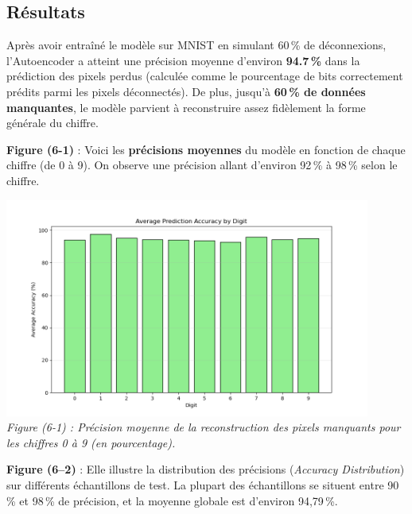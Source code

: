 \documentclass[a4paper,12pt]{article}
\begin{document}
\subsection{Résultats}  
Apr\`es avoir entra\^in\'e le mod\`ele sur MNIST en simulant 60\,\% de d\'econnexions, l'Autoencoder a atteint une pr\'ecision moyenne d'environ \textbf{94.7\,\%} dans la pr\'ediction des pixels perdus (calculée comme le pourcentage de bits correctement prédits parmi les pixels déconnectés). De plus, jusqu'\`a \textbf{60\,\% de donn\'ees manquantes}, le mod\`ele parvient \`a reconstruire assez fid\`element la forme g\'en\'erale du chiffre.


\noindent
\textbf{Figure (6-1)} : Voici les \textbf{précisions moyennes} du modèle en fonction de chaque chiffre (de 0 à 9). On observe une précision allant d’environ 92\,\% à 98\,\% selon le chiffre.


\begin{center}
\includegraphics[width=0.9\textwidth]{accuracy_by_digit.png}\\
\emph{Figure (6-1) : Précision moyenne de la reconstruction des pixels manquants pour les chiffres 0 à 9 (en pourcentage).}
\end{center}

\noindent
\textbf{Figure (6--2)} : Elle illustre la distribution des précisions (\emph{Accuracy Distribution}) sur différents échantillons de test. La plupart des échantillons se situent entre 90\,\% et 98\,\% de précision, et la moyenne globale est d’environ 94,79\,\%.
\end{document}
